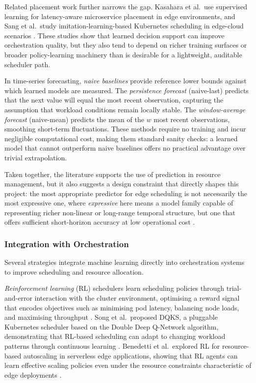 Related placement work further narrows the gap. Kasahara et al.\ use supervised learning for latency-aware microservice placement in edge environments, and Sang et al.\ study imitation-learning-based Kubernetes scheduling in edge-cloud scenarios \cite{kasahara2025supervised, sang2024imitation}. These studies show that learned decision support can improve orchestration quality, but they also tend to depend on richer training surfaces or broader policy-learning machinery than is desirable for a lightweight, auditable scheduler path.

In time-series forecasting, \textit{naive baselines} provide reference lower bounds against which learned models are measured. The \textit{persistence forecast} (naive-last) predicts that the next value will equal the most recent observation, capturing the assumption that workload conditions remain locally stable. The \textit{window-average forecast} (naive-mean) predicts the mean of the $w$ most recent observations, smoothing short-term fluctuations. These methods require no training and incur negligible computational cost, making them standard sanity checks: a learned model that cannot outperform naive baselines offers no practical advantage over trivial extrapolation.

Taken together, the literature supports the use of prediction in resource management, but it also suggests a design constraint that directly shapes this project: the most appropriate predictor for edge scheduling is not necessarily the most expressive one, where \textit{expressive} here means a model family capable of representing richer non-linear or long-range temporal structure, but one that offers sufficient short-horizon accuracy at low operational cost \cite{calheiros2015arima, toka2021scaling, kasahara2025supervised}.



\subsubsection{Integration with Orchestration}

Several strategies integrate machine learning directly into orchestration systems to improve scheduling and resource allocation.

\textit{Reinforcement learning} (RL) schedulers learn scheduling policies through trial-and-error interaction with the cluster environment, optimising a reward signal that encodes objectives such as minimising pod latency, balancing node loads, and maximising throughput \cite{pattan2025reinforcement}. Song et al.\ proposed DQKS, a pluggable Kubernetes scheduler based on the Double Deep Q-Network algorithm, demonstrating that RL-based scheduling can adapt to changing workload patterns through continuous learning \cite{song2025dqks}. Benedetti et al.\ explored RL for resource-based autoscaling in serverless edge applications, showing that RL agents can learn effective scaling policies even under the resource constraints characteristic of edge deployments \cite{benedetti2022reinforcement}.

